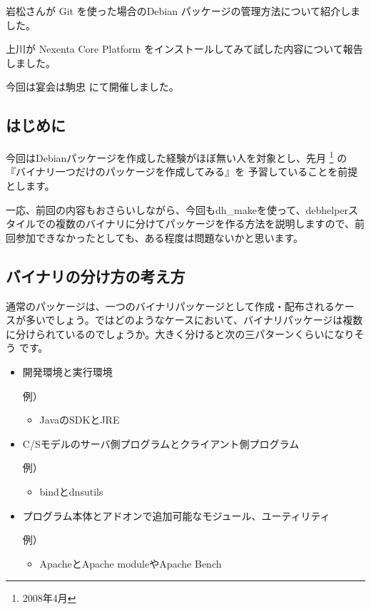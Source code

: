 \documentclass[mingoth,a4paper]{jsarticle}
\begin{document}
岩松さんが Git を使った場合のDebian パッケージの管理方法について紹介しました。

上川が Nexenta Core Platform をインストールしてみて試した内容について報告しました。

今回は宴会は駒忠
にて開催しました。

\label{sec:multibinpkg}

\subsection{はじめに}

今回はDebianパッケージを作成した経験がほぼ無い人を対象とし、先月
\footnote{2008年4月} の『バイナリ一つだけのパッケージを作成してみる』を
予習していることを前提とします。

一応、前回の内容もおさらいしながら、今回もdh\_makeを使って、debhelperス
タイルでの複数のバイナリに分けてパッケージを作る方法を説明しますので、前
回参加できなかったとしても、ある程度は問題ないかと思います。

\subsection{バイナリの分け方の考え方}
通常のパッケージは、一つのバイナリパッケージとして作成・配布されるケー
スが多いでしょう。ではどのようなケースにおいて、バイナリパッケージは複数
に分けられているのでしょうか。大きく分けると次の三パターンくらいになりそう
です。

\begin{itemize}
 \item
開発環境と実行環境

例）
      \begin{itemize}
       \item
	    JavaのSDKとJRE

      \end{itemize}
 \item
C/Sモデルのサーバ側プログラムとクライアント側プログラム

例）
      \begin{itemize}
       \item
	    bindとdnsutils
      \end{itemize}

 \item
プログラム本体とアドオンで追加可能なモジュール、ユーティリティ

例）
      \begin{itemize}
       \item
	    ApacheとApache moduleやApache Bench
      \end{itemize}
\end{itemize}
\end{document}
